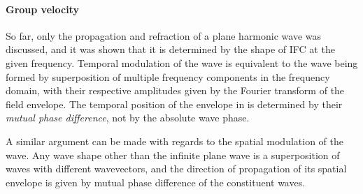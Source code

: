 \paragraph{Group velocity}  %
So far, only the propagation and refraction of a plane harmonic wave was discussed, and it was shown that it is determined by the shape of IFC at the given frequency.
Temporal modulation of the wave 
is equivalent to the wave being formed by superposition of multiple frequency components in the frequency domain, with their respective amplitudes given by the Fourier transform of the field envelope. The temporal position of the envelope in is determined by their \textit{mutual phase difference}, not by the absolute wave phase. 

A similar argument can be made with regards to the spatial modulation of the wave. Any wave shape other than the infinite plane wave is a superposition of waves with different wavevectors, and the direction of propagation of its spatial envelope is given by mutual phase difference of the constituent waves. %

